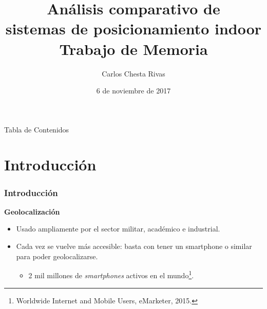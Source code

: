\documentclass[mathserif]{beamer}
\title[Análisis comparativo de sistemas de posicionamiento indoor]{Análisis comparativo de \\sistemas de posicionamiento indoor\\\normalsize Trabajo de Memoria} %
\author{Carlos Chesta Rivas} %
\institute[UTFSM] %
{
Universidad Técnica Federico Santa María \\ %
\medskip
\textit{carlos.chesta@alumnos.usm.cl} %
}
\date{6 de noviembre de 2017} %
\begin{document}
\begin{frame}
\titlepage %
\end{frame}

\begin{frame}{Tabla de Contenidos}
\begin{multicols}{2}
  \tableofcontents
\end{multicols}
\end{frame}




\section{Introducción} 

\begin{frame}
\frametitle{Introducción}

\textbf{Geolocalización}
\begin{itemize}


\item Usado ampliamente por el sector militar, académico e industrial.

\item Cada vez se vuelve más accesible: basta con tener un smartphone o similar para poder geolocalizarse.

\begin{itemize}
\item 2 mil millones de \textit{smartphones} activos en el mundo\footnote{Worldwide Internet and Mobile Users, eMarketer, 2015.}.
\end{itemize}

\end{itemize}



\end{frame}
\end{document}

